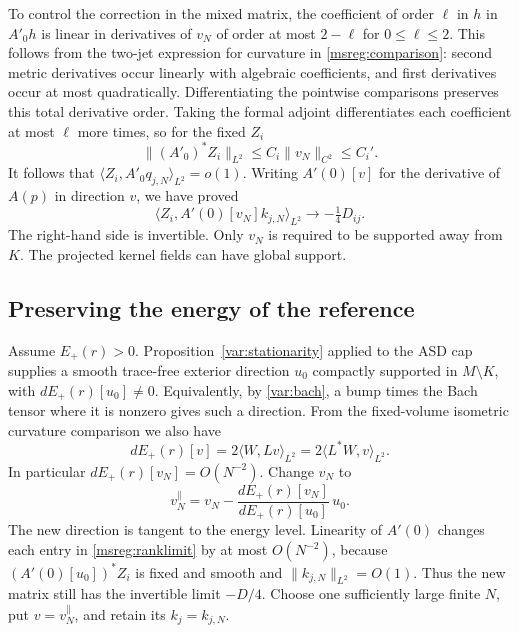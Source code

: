 \documentclass[11pt]{article}
\numberwithin{equation}{section}
\theoremstyle{definition}
\theoremstyle{remark}
\begin{document}
To control the correction in the mixed matrix, the coefficient
of order \(\ell\) in \(h\) in \(A'_0 h\) is linear in derivatives
of \(v_N\) of order at most \(2-\ell\) for \(0\le\ell\le2\).
This follows from the two-jet expression for curvature in
\eqref{msreg:comparison}: second metric derivatives occur
linearly with algebraic coefficients, and first derivatives
occur at most quadratically. Differentiating the pointwise
comparisons preserves this total derivative order. Taking the
formal adjoint differentiates each coefficient at most
\(\ell\) more times, so for the fixed \(Z_i\)
\[
 \|(A'_0)^*Z_i\|_{L^2}\le C_i\|v_N\|_{C^2}\le C_i'.
\]
It follows that \(\langle Z_i,A'_0 q_{j,N}\rangle_{L^2}=o(1)\).
Writing \(A'(0)[v]\) for the derivative of \(A(p)\) in direction
\(v\), we have proved
\begin{equation}
 \langle Z_i,A'(0)[v_N]k_{j,N}\rangle_{L^2}
       \longrightarrow -\tfrac14D_{ij}.
 \label{msreg:ranklimit}
\end{equation}
The right-hand side is invertible. Only \(v_N\) is required
to be supported away from \(K\). The projected kernel fields
can have global support.

\subsection{Preserving the energy of the reference}

Assume \(E_+(r)>0\). Proposition~\ref{var:stationarity} applied
to the ASD cap supplies a smooth trace-free exterior direction
\(u_0\) compactly supported in \(M\setminus K\), with
\(dE_+(r)[u_0]\ne0\). Equivalently, by \eqref{var:bach},
a bump times the Bach tensor where it is nonzero gives
such a direction. From the fixed-volume isometric curvature
comparison we also have
\[
 dE_+(r)[v]=2\langle W,Lv\rangle_{L^2}
           =2\langle L^*W,v\rangle_{L^2}.
\]
In particular \(dE_+(r)[v_N]=O(N^{-2})\). Change \(v_N\) to
\[
 v_N^\parallel=v_N-\frac{dE_+(r)[v_N]}{dE_+(r)[u_0]}\,u_0 .
\]
The new direction is tangent to the energy level. Linearity
of \(A'(0)\) changes each entry in \eqref{msreg:ranklimit}
by at most \(O(N^{-2})\), because \((A'(0)[u_0])^*Z_i\)
is fixed and smooth and \(\|k_{j,N}\|_{L^2}=O(1)\).
Thus the new matrix still has the invertible limit
\(-D/4\). Choose one sufficiently large finite \(N\), put
\(v=v_N^\parallel\), and retain its \(k_j=k_{j,N}\).
\end{document}
